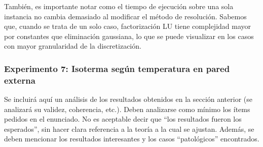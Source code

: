   		También, es importante notar como el tiempo de ejecución sobre una sola instancia no cambia demasiado al modificar el método de resolución. Sabemos que, cuando se trata de un solo caso, factorización LU tiene complejidad mayor por constantes que eliminación gaussiana, lo que se puede visualizar en los casos con mayor granularidad de la discretización.



    \subsubsection*{Experimento 7: Isoterma según temperatura en pared externa}



  {\color{Gray} Se incluirá aquí un análisis de los resultados obtenidos en la sección anterior (se analizará su validez, coherencia, etc.). Deben analizarse como mínimo los ítems pedidos en el enunciado. No es aceptable decir que ``los resultados fueron los esperados'', sin hacer clara referencia a la teoría a la cual se ajustan. Además, se deben mencionar los resultados interesantes y los casos ``patológicos'' encontrados.}
